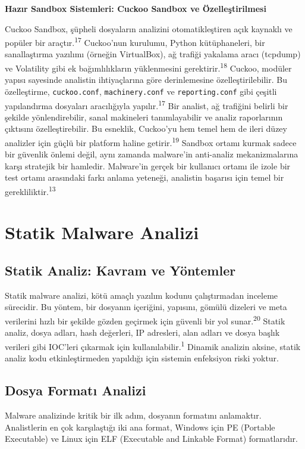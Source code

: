 \textbf{Hazır Sandbox Sistemleri: Cuckoo Sandbox ve Özelleştirilmesi}

Cuckoo Sandbox, şüpheli dosyaların analizini otomatikleştiren açık kaynaklı ve popüler bir araçtır.\textsuperscript{17} Cuckoo'nun kurulumu, Python kütüphaneleri, bir sanallaştırma yazılımı (örneğin VirtualBox), ağ trafiği yakalama aracı (tcpdump) ve Volatility gibi ek bağımlılıkların yüklenmesini gerektirir.\textsuperscript{18} Cuckoo, modüler yapısı sayesinde analistin ihtiyaçlarına göre derinlemesine özelleştirilebilir. Bu özelleştirme, \texttt{cuckoo.conf}, \texttt{machinery.conf} ve \texttt{reporting.conf} gibi çeşitli yapılandırma dosyaları aracılığıyla yapılır.\textsuperscript{17} Bir analist, ağ trafiğini belirli bir şekilde yönlendirebilir, sanal makineleri tanımlayabilir ve analiz raporlarının çıktısını özelleştirebilir. Bu esneklik, Cuckoo'yu hem temel hem de ileri düzey analizler için güçlü bir platform haline getirir.\textsuperscript{19} Sandbox ortamı kurmak sadece bir güvenlik önlemi değil, aynı zamanda malware'in anti-analiz mekanizmalarına karşı stratejik bir hamledir. Malware'in gerçek bir kullanıcı ortamı ile izole bir test ortamı arasındaki farkı anlama yeteneği, analistin başarısı için temel bir gerekliliktir.\textsuperscript{13}

\section{Statik Malware Analizi}

\subsection{Statik Analiz: Kavram ve Yöntemler}

Statik malware analizi, kötü amaçlı yazılım kodunu çalıştırmadan inceleme sürecidir. Bu yöntem, bir dosyanın içeriğini, yapısını, gömülü dizeleri ve meta verilerini hızlı bir şekilde gözden geçirmek için güvenli bir yol sunar.\textsuperscript{20} Statik analiz, dosya adları, hash değerleri, IP adresleri, alan adları ve dosya başlık verileri gibi IOC'leri çıkarmak için kullanılabilir.\textsuperscript{1} Dinamik analizin aksine, statik analiz kodu etkinleştirmeden yapıldığı için sistemin enfeksiyon riski yoktur.

\subsection{Dosya Formatı Analizi}

Malware analizinde kritik bir ilk adım, dosyanın formatını anlamaktır. Analistlerin en çok karşılaştığı iki ana format, Windows için PE (Portable Executable) ve Linux için ELF (Executable and Linkable Format) formatlarıdır.

